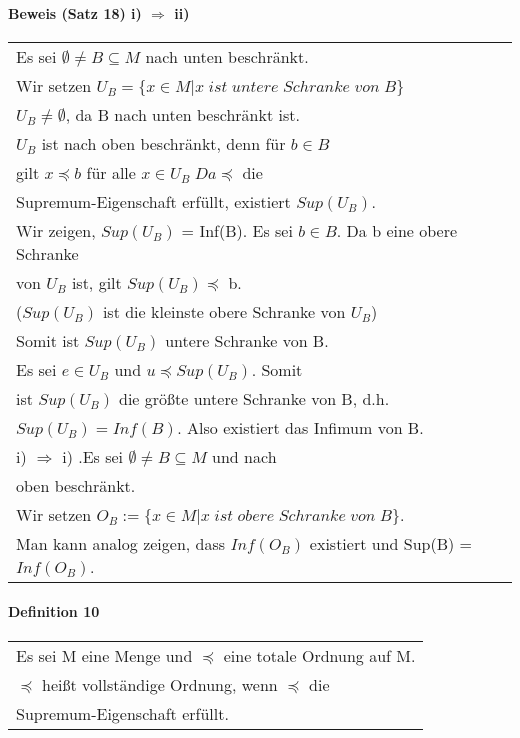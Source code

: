 \documentclass[a4paper]{scrartcl}
\begin{document}
\paragraph{Beweis (Satz 18) i) $ \Rightarrow $ ii)}
\begin{tabbing}
\begin{tabular}{l}
Es sei $ \emptyset \neq B \subseteq M $ nach unten beschränkt.\\
Wir setzen $ U_B = \{ x \in M | x\;ist\;untere\;Schranke\;von\;B \} $ \\ 
$ U_B  \neq \emptyset $, da B nach unten beschränkt ist.\\
$ U_B $ ist nach oben beschränkt, denn für $ b\in B $ \\
gilt $ x \preceq b $ für alle $ x\in U_B \; Da \preceq $ die \\
Supremum-Eigenschaft erfüllt, existiert $ Sup(U_B)$.\\
Wir zeigen, $Sup(U_B)$ = Inf(B). Es sei $ b\in B $. Da b eine obere Schranke\\
von $U_B$ ist, gilt $Sup(U_B) \preceq $ b.\\
($Sup(U_B)$ ist die kleinste obere Schranke von $ U_B $)\\
Somit ist $Sup(U_B)$ untere Schranke von B.\\
Es sei $ e\in U_B $ und $ u \preceq Sup(U_B) $. Somit\\
ist $Sup(U_B)$ die größte untere Schranke von B, d.h.\\
$Sup(U_B) = Inf(B)$. Also existiert das Infimum von B.\\
i) $ \Rightarrow $ i) .Es sei $ \emptyset \neq B \subseteq M $ und nach \\
oben beschränkt.\\
Wir setzen $ O_B :=\{ x\in M | x\;ist\;obere\;Schranke\;von\;B \}$.\\
Man kann analog zeigen, dass $Inf(O_B)$ existiert und Sup(B) = $Inf(O_B)$. 
\end{tabular}
\end{tabbing}

\paragraph{Definition 10}
\begin{tabbing}
\begin{tabular}{l}
Es sei M eine Menge und $ \preceq $ eine totale Ordnung auf M.\\
$\preceq$ heißt vollständige Ordnung, wenn $\preceq$ die\\
Supremum-Eigenschaft erfüllt.
\end{tabular}
\end{tabbing}
\end{document}
